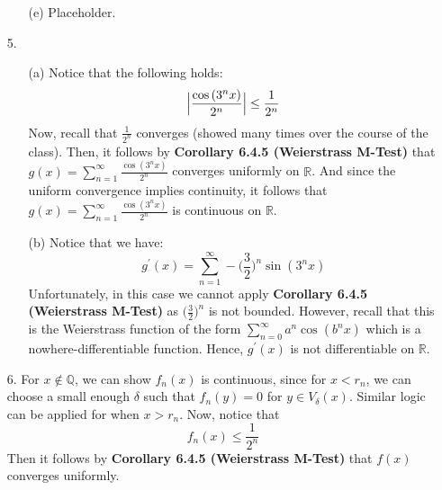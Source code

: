 \documentclass[11pt]{article}
\DeclarePairedDelimiter\absb{\Big\lvert}{\Big\rvert}%
\newcommand{\reals}{\mathbb{R}}
\begin{document}
\begin{itemize}
\begin{itemize}
            \item[(e)]
                Placeholder.
        \end{itemize}

    \item[5.]
        \begin{itemize}
            \item[(a)]
                Notice that the following holds:
                \begin{equation*}
                    \absb{\frac{\cos{(3^nx)}}{2^n}} \leq \frac{1}{2^n}
                \end{equation*}
                Now, recall that $\frac{1}{2^n}$ converges (showed many times
                over the course of the class). Then, it follows by
                \textbf{Corollary 6.4.5 (Weierstrass M-Test)} that $g(x) =
                \sum_{n = 1}^\infty \frac{\cos{(3^nx)}}{2^n}$ converges
                uniformly on $\reals$. And since the uniform convergence
                implies continuity, it follows that $g(x) = \sum_{n = 1}^\infty
                \frac{\cos{(3^nx)}}{2^n}$ is continuous on $\reals$.

            \item[(b)]
                Notice that we have:
                \begin{equation*}
                    g^\prime(x) =
                        \sum_{n = 1}^\infty
                            -\Big(\frac{3}{2}\Big)^n\sin{(3^nx)}
                \end{equation*}
                Unfortunately, in this case we cannot apply \textbf{Corollary
                6.4.5 (Weierstrass M-Test)} as $\Big(\frac{3}{2}\Big)^n$ is not
                bounded. However, recall that this is the Weierstrass function
                of the form $\sum_{n = 0}^\infty a^n\cos{(b^nx)}$ which is a
                nowhere-differentiable function. Hence, $g^\prime(x)$ is not
                differentiable on $\reals$.
        \end{itemize}

    \item[6.]
        For $x \not\in \mathbb{Q}$, we can show $f_n(x)$ is continuous, since
        for $x < r_n$, we can choose a small enough $\delta$ such that $f_n(y)
        = 0$ for $y \in V_\delta(x)$. Similar logic can be applied for when $x
        > r_n$.
        Now, notice that
        \begin{equation*}
            f_n(x) \leq \frac{1}{2^n}
        \end{equation*}
        Then it follows by \textbf{Corollary 6.4.5 (Weierstrass M-Test)} that
        $f(x)$ converges uniformly.


\end{itemize}
\end{document}
